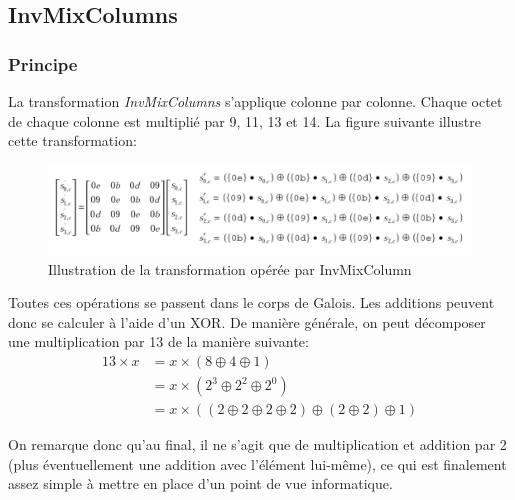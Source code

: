 \documentclass[a4paper, 12pt]{article}
\begin{document}
	\subsection{InvMixColumns}
		\subsubsection{Principe}
La transformation \emph{InvMixColumns} s'applique colonne par colonne. Chaque octet de chaque colonne est multiplié par 9, 11, 13 et 14. La figure suivante illustre cette transformation:
		\begin{figure}[H]
			\begin{center}
			\includegraphics[scale=0.4]{Images/PrincipeInvMixColumns.png}
			\end{center}
			\caption{Illustration de la transformation opérée par InvMixColumn}
			\label{PrincipeInvMixColumns}
		\end{figure}
Toutes ces opérations se passent dans le corps de Galois. Les additions peuvent donc se calculer à l'aide d'un XOR. De manière générale, on peut décomposer une multiplication par 13 de la manière suivante:
		\begin{align*}
		13 \times x &= x \times (8 \oplus 4 \oplus 1) \\
					&= x \times (2^3 \oplus 2^2 \oplus 2^0) \\
					&= x \times ((2 \oplus 2 \oplus 2 \oplus 2) \oplus (2 \oplus 2) \oplus 1)
		\end{align*}
\par On remarque donc qu'au final, il ne s'agit que de multiplication et addition par 2 (plus éventuellement une addition avec l'élément lui-même), ce qui est finalement assez simple à mettre en place d'un point de vue informatique.
		
\end{document}
